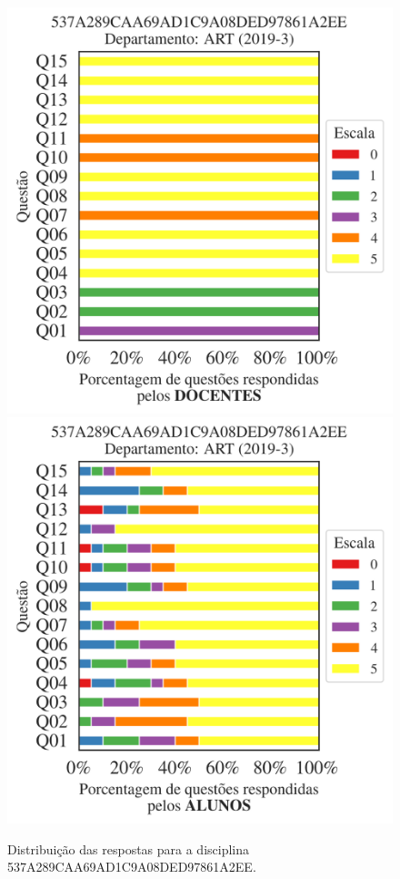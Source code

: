 \documentclass[a4paper,10pt]{article}
\begin{document}
\begin{figure}[h]
\centering
\includegraphics[width=0.485\linewidth]{analise_disciplina_departamento_ART_537A289CAA69AD1C9A08DED97861A2EE_docentes.png}
\includegraphics[width=0.485\linewidth]{analise_disciplina_departamento_ART_537A289CAA69AD1C9A08DED97861A2EE_alunos.png}
\caption{\label{fig:analise_geral_departamento}                Distribuição das respostas para a disciplina 537A289CAA69AD1C9A08DED97861A2EE. }
\end{figure}
\end{document}
